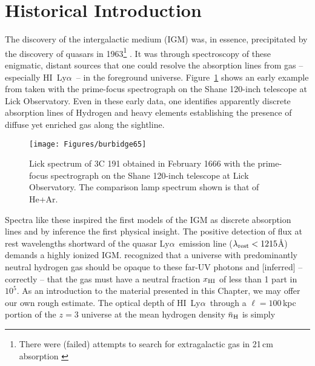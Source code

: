 \documentclass[graybox]{svmult}
\newcommand{\HI}{H{\sc I}}
\def\lya{Ly$\alpha$}
\begin{document}
\section{Historical Introduction}
\label{sec:history}

The discovery of the intergalactic medium (IGM)
was, in essence, precipitated by the discovery of 
quasars in 1963\footnote{There were (failed) attempts
to search for extragalactic gas in 21\,cm absorption
\cite{field59}} \cite{schmidt63}.
It was through spectroscopy of these enigmatic, distant
sources that one could resolve the absorption lines
from gas -- especially \HI\ \lya\ -- 
in the foreground universe.  
Figure~\ref{fig:burb} shows an early example from
\cite{bb+65} taken with the prime-focus spectrograph
on the Shane 120-inch telescope at Lick Observatory.
Even in these early data, one identifies apparently
discrete absorption lines of Hydrogen and heavy
elements establishing the presence of diffuse yet
enriched gas along the sightline.



%
\begin{figure}[b]
\sidecaption
\texttt{[image: Figures/burbidge65]}
%
%
\caption{Lick spectrum of 3C 191 obtained in February 1666
with the prime-focus spectrograph on the Shane 120-inch
telescope at Lick Observatory.  The comparison lamp spectrum
shown is that of He+Ar.
}
\label{fig:burb}       %
\end{figure}


Spectra like these inspired the first models of
the IGM as discrete absorption lines \cite{bahcall65}
and by inference the first physical insight.
The positive detection of flux at rest wavelengths
shortward of the quasar \lya\ emission line
($\lambda_{\rm rest} < 1215$\AA)
demands a highly ionized IGM.
\cite{gunn65} recognized that a universe with predominantly
neutral hydrogen gas should be opaque to these far-UV
photons and [inferred] -- correctly -- 
that the gas must have a neutral fraction $x_{\rm HI}$ of less 
than 1 part in $10^5$.
As an introduction to the material presented in this Chapter,
we may offer our own rough estimate.
The optical depth of \HI\ \lya\ through
a $\ell = 100$\,kpc portion of the $z=3$ universe
at the mean hydrogen density $\bar n_{\rm H}$ 
is simply
\end{document}
